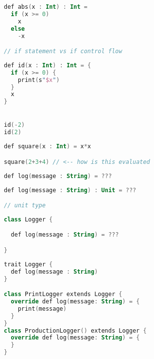 \documentclass[10pt]{beamer}
\begin{document}
\begin{frame}[fragile]
\begin{lstlisting}[language=Kotlin, basicstyle=\ttfamily]
def abs(x : Int) : Int =  
  if (x >= 0) 
    x 
  else 
    -x  

// if statement vs if control flow 
\end{lstlisting}
\end{frame}

\begin{frame}[fragile]
\begin{lstlisting}[language=Kotlin, basicstyle=\ttfamily]
def id(x : Int) : Int = {
  if (x >= 0) {
    print(s"$x")
  }
  x
}


id(-2)
id(2)
\end{lstlisting}
\end{frame}


\begin{frame}[fragile]
\begin{lstlisting}[language=Kotlin, basicstyle=\ttfamily]
def square(x : Int) = x*x

square(2+3+4) // <-- how is this evaluated
\end{lstlisting}
\end{frame}


\begin{frame}[fragile]
\begin{lstlisting}[language=Kotlin, basicstyle=\ttfamily]
def log(message : String) = ???
\end{lstlisting}
\end{frame}

\begin{frame}[fragile]
\begin{lstlisting}[language=Kotlin, basicstyle=\ttfamily]
def log(message : String) : Unit = ???

// unit type
\end{lstlisting}
\end{frame}


\begin{frame}[fragile]
\begin{lstlisting}[language=Kotlin, basicstyle=\ttfamily]
class Logger {

  def log(message : String) = ???

}
\end{lstlisting}
\end{frame}


\begin{frame}[fragile]
\begin{lstlisting}[language=Kotlin, basicstyle=\ttfamily]
trait Logger {
  def log(message : String)
}

class PrintLogger extends Logger {
  override def log(message: String) = {
    print(message)
  }
}
class ProductionLogger() extends Logger {
  override def log(message: String) = {
  }
}
\end{lstlisting}
\end{frame}
\end{document}
